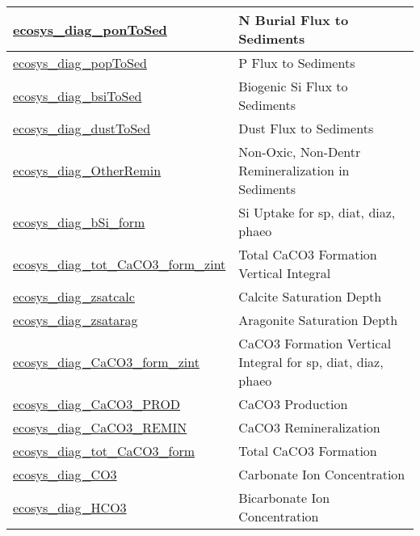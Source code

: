 {\begin{center}
\begin{longtable}{| p{2.0in} | p{4.0in} |}
    \hline
    \hyperref[subsec:var_sec_forcing_ecosys_diag_ponToSed]{ecosys\_diag\_ponToSed} & N Burial Flux to Sediments \\
    \hline
    \hyperref[subsec:var_sec_forcing_ecosys_diag_popToSed]{ecosys\_diag\_popToSed} & P Flux to Sediments \\
    \hline
    \hyperref[subsec:var_sec_forcing_ecosys_diag_bsiToSed]{ecosys\_diag\_bsiToSed} & Biogenic Si Flux to Sediments \\
    \hline
    \hyperref[subsec:var_sec_forcing_ecosys_diag_dustToSed]{ecosys\_diag\_dustToSed} & Dust Flux to Sediments \\
    \hline
    \hyperref[subsec:var_sec_forcing_ecosys_diag_OtherRemin]{ecosys\_diag\_OtherRemin} & Non-Oxic, Non-Dentr Remineralization in Sediments \\
    \hline
    \hyperref[subsec:var_sec_forcing_ecosys_diag_bSi_form]{ecosys\_diag\_bSi\_form} & Si Uptake for sp, diat, diaz, phaeo \\
    \hline
    \hyperref[subsec:var_sec_forcing_ecosys_diag_tot_CaCO3_form_zint]{ecosys\_diag\_tot\_CaCO3\_form\_\-zint} & Total CaCO3 Formation Vertical Integral \\
    \hline
    \hyperref[subsec:var_sec_forcing_ecosys_diag_zsatcalc]{ecosys\_diag\_zsatcalc} & Calcite Saturation Depth \\
    \hline
    \hyperref[subsec:var_sec_forcing_ecosys_diag_zsatarag]{ecosys\_diag\_zsatarag} & Aragonite Saturation Depth \\
    \hline
    \hyperref[subsec:var_sec_forcing_ecosys_diag_CaCO3_form_zint]{ecosys\_diag\_CaCO3\_form\_zint} & CaCO3 Formation Vertical Integral for sp, diat, diaz, phaeo \\
    \hline
    \hyperref[subsec:var_sec_forcing_ecosys_diag_CaCO3_PROD]{ecosys\_diag\_CaCO3\_PROD} & CaCO3 Production \\
    \hline
    \hyperref[subsec:var_sec_forcing_ecosys_diag_CaCO3_REMIN]{ecosys\_diag\_CaCO3\_REMIN} & CaCO3 Remineralization \\
    \hline
    \hyperref[subsec:var_sec_forcing_ecosys_diag_tot_CaCO3_form]{ecosys\_diag\_tot\_CaCO3\_form} & Total CaCO3 Formation \\
    \hline
    \hyperref[subsec:var_sec_forcing_ecosys_diag_CO3]{ecosys\_diag\_CO3} & Carbonate Ion Concentration \\
    \hline
    \hyperref[subsec:var_sec_forcing_ecosys_diag_HCO3]{ecosys\_diag\_HCO3} & Bicarbonate Ion Concentration \\

\end{longtable}
\end{center}}
